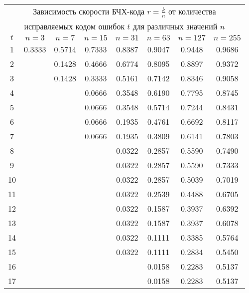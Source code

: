\documentclass[12pt]{article}
\begin{document}
            \begin{center}
                \tiny
                \begin{longtable}{|c|c|c|c|c|c|c|c|}
                    \hline
                    \multicolumn{8}{|c|}{Зависимость скорости БЧХ-кода $r=\frac{k}{n}$ от количества} \\
                    \multicolumn{8}{|c|}{исправляемых кодом ошибок $t$ для различных значений $n$} \\
                    \hline
                    $t$ & $n = 3$ & $n = 7$ & $n = 15$ & $n = 31$ & $n = 63$ & $n = 127$ & $n = 255$ \\
                    \hline
                    1 & 0.3333 & 0.5714 & 0.7333 & 0.8387 & 0.9047 & 0.9448 & 0.9686 \\
                    2 &  & 0.1428 & 0.4666 & 0.6774 & 0.8095 & 0.8897 & 0.9372 \\
                    3 &  & 0.1428 & 0.3333 & 0.5161 & 0.7142 & 0.8346 & 0.9058 \\
                    4 &  &  & 0.0666 & 0.3548 & 0.6190 & 0.7795 & 0.8745 \\
                    5 &  &  & 0.0666 & 0.3548 & 0.5714 & 0.7244 & 0.8431 \\
                    6 &  &  & 0.0666 & 0.1935 & 0.4761 & 0.6692 & 0.8117 \\
                    7 &  &  & 0.0666 & 0.1935 & 0.3809 & 0.6141 & 0.7803 \\
                    8 &  &  &  & 0.0322 & 0.2857 & 0.5590 & 0.7490 \\
                    9 &  &  &  & 0.0322 & 0.2857 & 0.5590 & 0.7333 \\
                    10 &  &  &  & 0.0322 & 0.2857 & 0.5039 & 0.7019 \\
                    11 &  &  &  & 0.0322 & 0.2539 & 0.4488 & 0.6705 \\
                    12 &  &  &  & 0.0322 & 0.1587 & 0.3937 & 0.6392 \\
                    13 &  &  &  & 0.0322 & 0.1587 & 0.3937 & 0.6078 \\
                    14 &  &  &  & 0.0322 & 0.1111 & 0.3385 & 0.5764 \\
                    15 &  &  &  & 0.0322 & 0.1111 & 0.2834 & 0.5450 \\
                    16 &  &  &  &  & 0.0158 & 0.2283 & 0.5137 \\
                    17 &  &  &  &  & 0.0158 & 0.2283 & 0.5137 \\

\end{longtable}
\end{center}
\end{document}
